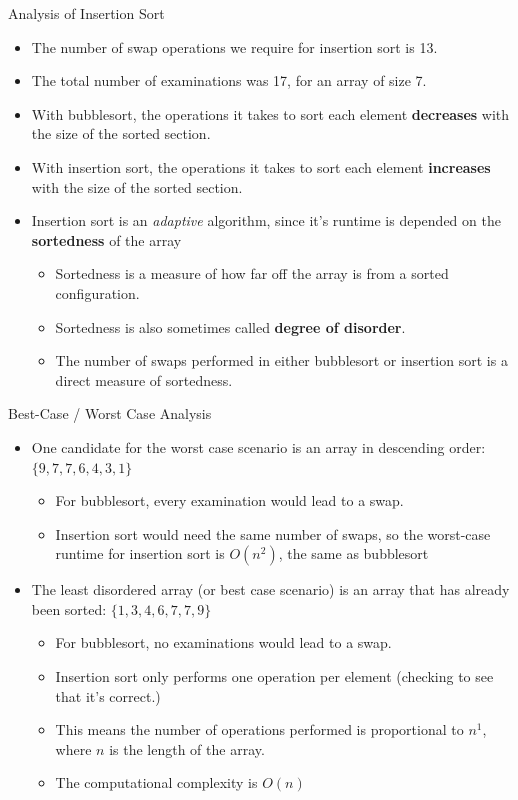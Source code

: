 \documentclass[11pt]{beamer}
\begin{document}
\begin{frame}{Analysis of Insertion Sort}
\begin{itemize}
\item The number of swap operations we require for insertion sort is 13.   
\item The total number of examinations was 17, for an array of size 7.
\item With bubblesort, the operations it takes to sort each element \textbf{decreases} with the size of the sorted section.
\item With insertion sort, the operations it takes to sort each element \textbf{increases} with the size of the sorted section.  
\item Insertion sort is an \emph{adaptive} algorithm, since it's runtime is depended on the \textbf{sortedness} of the array
\begin{itemize}
\item Sortedness is a measure of how far off the array is from a sorted configuration. 
\item Sortedness is also sometimes called \textbf{degree of disorder}.  
\item The number of swaps performed in either bubblesort or insertion sort is a direct measure of sortedness.
\end{itemize}
\end{itemize}
\end{frame}

\begin{frame}{Best-Case / Worst Case Analysis}
\begin{itemize}
\item One candidate for the worst case scenario is an array in descending order: $\{9,7,7,6,4,3,1\}$
\begin{itemize}
\item For bubblesort, every examination would lead to a swap.  
\item Insertion sort would need the same number of swaps, so the worst-case runtime for insertion sort is $O(n^2)$, the same as bubblesort
\end{itemize}
\item The least disordered array (or best case scenario) is an array that has already been sorted: $\{1,3,4,6,7,7,9\}$
\begin{itemize}
\item For bubblesort, no examinations would lead to a swap.
\item Insertion sort only performs one operation per element (checking to see that it's correct.)
\item This means the number of operations performed is proportional to $n^1$, where $n$ is the length of the array.
\item The computational complexity is $O(n)$
\end{itemize}
\end{itemize}
\end{frame}
\end{document}

